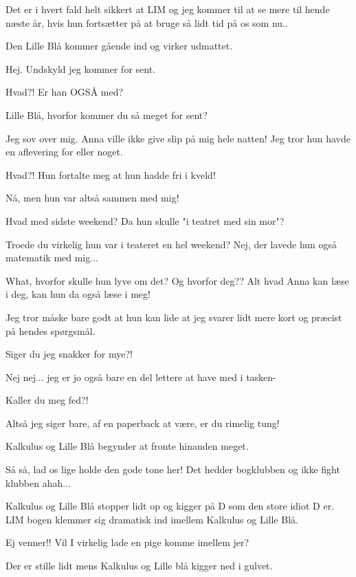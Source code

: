 \documentclass[a4paper,11pt]{article}
\begin{document}
\begin{sketch}
 Det er i hvert fald helt sikkert at LIM og jeg kommer til at se mere til hende næste år, hvis hun fortsætter på at bruge så lidt tid på os som nu.. 

\scene Den Lille Blå kommer gående ind og virker udmattet. 

 Hej. Undskyld jeg kommer for sent. 

 Hvad?! Er han OGSÅ med? 

 Lille Blå, hvorfor kommer du så meget for sent? 

 Jeg sov over mig. Anna ville ikke give slip på mig hele natten! Jeg tror hun havde en aflevering for eller noget. 

 Hvad?! Hun fortalte meg at hun hadde fri i kveld!

  Nå, men hun var altså sammen med mig! 

 Hvad med sidste weekend? Da hun skulle "i teatret med sin mor"? 

 Troede du virkelig hun var i teateret en hel weekend? Nej, der lavede hun også matematik med mig... 

 What, hvorfor skulle hun lyve om det? Og hvorfor deg?? Alt hvad Anna kan læse i deg, kan hun da også læse i meg! 

 Jeg tror måske bare godt at hun kan lide at jeg svarer lidt mere kort og præcist på hendes spørgsmål.

 Siger du jeg snakker for mye?! 

 Nej nej... jeg er jo også bare en del lettere at have med i tasken-

 Kaller du meg fed?!

 Altså jeg siger bare, af en paperback at være, er du rimelig tung!

\scene Kalkulus og Lille Blå begynder at fronte hinanden meget. 

 Så så, lad os lige holde den gode tone her! Det hedder bogklubben og ikke fight klubben ahah... 

\scene Kalkulus og Lille Blå stopper lidt op og kigger på D som den store idiot D er. LIM bogen klemmer sig dramatisk ind imellem Kalkulus og Lille Blå. 

 Ej venner!! Vil I virkelig lade en pige komme imellem jer?

\scene Der er stille lidt mens Kalkulus og Lille blå kigger ned i gulvet. 


\end{sketch}
\end{document}
